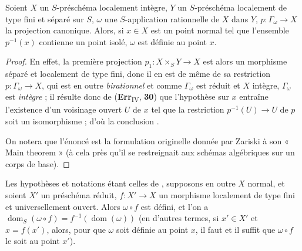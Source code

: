 \begin{proposition}[20.4.4]
\label{IV.20.4.4}
Soient $X$ un $S$-préschéma localement intègre, $Y$ un $S$-préschéma localement de type fini et séparé sur $S$, $\omega$ une $S$-application rationnelle de $X$ dans $Y$, $p:\Gamma_\omega\to X$ la projection canonique.
Alors, si $x\in X$ est un point \textup{normal} tel que l'ensemble $p^{-1}(x)$ contienne un point \textup{isolé}, $\omega$ est définie au point $x$.
\end{proposition}

\begin{proof}
En effet, la première projection $p_1:X\times_S Y\to X$ est alors un morphisme séparé et localement de type fini, donc il en est de même de sa restriction $p:\Gamma_\omega\to X$, qui est en outre \emph{birationnel} et comme $\Gamma_\omega$ est réduit et $X$ intègre, $\Gamma_\omega$ est \emph{intègre} ; il résulte donc de (\textbf{Err}\textsubscript{IV}, \textbf{30}) que l'hypothèse sur $x$ entraîne l'existence d'un voisinage ouvert $U$ de $x$ tel que la restriction $p^{-1}(U)\to U$ de $p$ soit un isomorphisme ; d'où la conclusion .

On notera que l'énoncé  est la formulation originelle donnée par Zariski à son « Main theorem » (à cela près qu'il se restreignait aux schémas algébriques sur un corps de base).
\end{proof}

\begin{proposition}[20.4.5]
\label{IV.20.4.5}
Les hypothèses et notations étant celles de , supposons en outre $X$ normal, et soient $X'$ un préschéma \textup{réduit}, $f:X'\to X$ un morphisme localement de type fini et \textup{universellement ouvert}.
Alors $\omega\circ f$ est défini, et l'on a $\operatorname{dom}_S(\omega\circ f)=f^{-1}(\operatorname{dom}(\omega))$ \textup{(en d'autres termes, si $x'\in X'$ et $x=f(x')$, alors, pour que $\omega$ soit définie au point $x$, il faut et il suffit que $\omega\circ f$ le soit au point $x'$)}.
\end{proposition}

